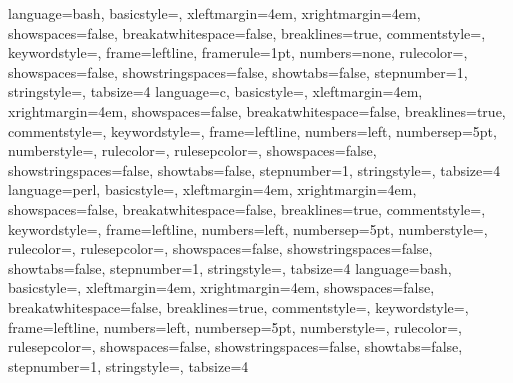 \usepackage[CJKbookmarks=true,colorlinks,linkcolor=blue, citecolor=blue]{hyperref}

\usepackage{listings}	
\usepackage[usenames,dvipsnames,svgnames]{xcolor} %
\lstset{
    basicstyle=\ttfamily,	%
}
 {
    language=bash,
    basicstyle=\scriptsize\ttfamily,
    xleftmargin=4em,
    xrightmargin=4em,
    showspaces=false,
    breakatwhitespace=false,
    breaklines=true,
    commentstyle=\color[rgb]{0,0.6,0},
    keywordstyle=\color{blue},
    frame=leftline,
    framerule=1pt,
    numbers=none,
    rulecolor=\color{blue},
    showspaces=false,
    showstringspaces=false,
    showtabs=false,
    stepnumber=1,
    stringstyle=\color[rgb]{0.58,0,0.82},
    tabsize=4
}
 {
    language=c,
    basicstyle=\scriptsize\ttfamily,
    xleftmargin=4em,
    xrightmargin=4em,
    showspaces=false,
    breakatwhitespace=false,
    breaklines=true,
    commentstyle=\color[rgb]{0,0.6,0},
    keywordstyle=\color{blue},
    frame=leftline,
    numbers=left,
    numbersep=5pt,
    numberstyle=\small\color[rgb]{0.5,0.5,0.5},
    rulecolor=\color{black},
    rulesepcolor=\color{blue},
    showspaces=false,
    showstringspaces=false,
    showtabs=false,
    stepnumber=1,
    stringstyle=\color[rgb]{0.58,0,0.82},
    tabsize=4
}
 {
    language=perl,
    basicstyle=\scriptsize\ttfamily,
    xleftmargin=4em,
    xrightmargin=4em,
    showspaces=false,
    breakatwhitespace=false,
    breaklines=true,
    commentstyle=\color[rgb]{0,0.6,0},
    keywordstyle=\color{blue},
    frame=leftline,
    numbers=left,
    numbersep=5pt,
    numberstyle=\small\color[rgb]{0.5,0.5,0.5},
    rulecolor=\color{black},
    rulesepcolor=\color{blue},
    showspaces=false,
    showstringspaces=false,
    showtabs=false,
    stepnumber=1,
    stringstyle=\color[rgb]{0.58,0,0.82},
    tabsize=4
}
 {
    language=bash,
    basicstyle=\scriptsize\ttfamily,
    xleftmargin=4em,
    xrightmargin=4em,
    showspaces=false,
    breakatwhitespace=false,
    breaklines=true,
    commentstyle=\color[rgb]{0,0.6,0},
    keywordstyle=\color{blue},
    frame=leftline,
    numbers=left,
    numbersep=5pt,
    numberstyle=\small\color[rgb]{0.5,0.5,0.5},
    rulecolor=\color{black},
    rulesepcolor=\color{blue},
    showspaces=false,
    showstringspaces=false,
    showtabs=false,
    stepnumber=1,
    stringstyle=\color[rgb]{0.58,0,0.82},
    tabsize=4
}

